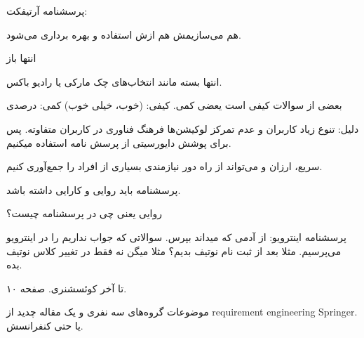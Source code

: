 پرسشنامه آرتیفکت:

هم می‌سازیمش هم ازش استفاده و بهره برداری می‌شود.

انتها باز

انتها بسته مانند انتخاب‌های چک مارکی یا رادیو باکس. 

بعضی از سوالات کیفی است یعضی کمی. 
کیفی: (خوب، خیلی خوب)
کمی: درصدی

دلیل: تنوع زیاد کاربران و عدم تمرکز لوکیشن‌ها فرهنگ فناوری در کاربران متفاوته.
پس برای پوشش دایورسیتی از پرسش نامه استفاده میکنیم.

سریع، ارزان و می‌تواند از راه دور نیازمندی‌ بسیاری از افراد را جمع‌آوری کنیم. 

پرسشنامه باید روایی و کارایی داشته باشد.

روایی یعنی چی در پرسشنامه چیست؟

پرسشنامه اینترویو: از آدمی که میداند بپرس. سوالاتی که جواب نداریم را در اینترویو
می‌پرسیم. مثلا بعد از ثبت نام نوتیف بدیم؟ مثلا میگن نه فقط در تغییر کلاس نوتیف
بده.

تا آخر کوئسشنری. صفحه ۱۰.

موضوعات گروه‌های سه نفری و یک مقاله چدید از requirement engineering Springer. یا
حتی کنفرانسش.